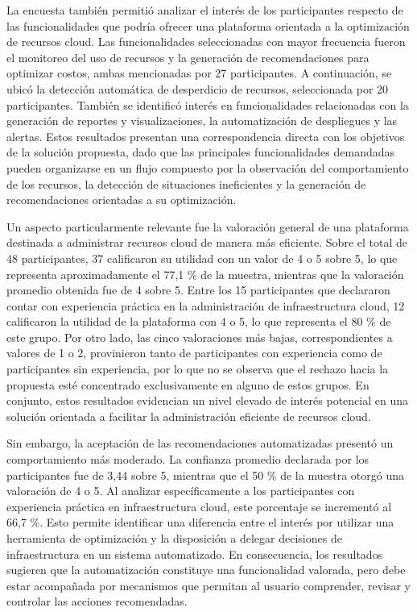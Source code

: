 La encuesta también permitió analizar el interés de los participantes
respecto de las funcionalidades que podría ofrecer una plataforma
orientada a la optimización de recursos cloud. Las funcionalidades
seleccionadas con mayor frecuencia fueron el monitoreo del uso de
recursos y la generación de recomendaciones para optimizar costos, ambas
mencionadas por 27 participantes. A continuación, se ubicó la detección
automática de desperdicio de recursos, seleccionada por 20
participantes. También se identificó interés en funcionalidades
relacionadas con la generación de reportes y visualizaciones, la
automatización de despliegues y las alertas. Estos resultados presentan
una correspondencia directa con los objetivos de la solución propuesta,
dado que las principales funcionalidades demandadas pueden organizarse
en un flujo compuesto por la observación del comportamiento de los
recursos, la detección de situaciones ineficientes y la generación de
recomendaciones orientadas a su optimización.

Un aspecto particularmente relevante fue la valoración general de una
plataforma destinada a administrar recursos cloud de manera más
eficiente. Sobre el total de 48 participantes, 37 calificaron su
utilidad con un valor de 4 o 5 sobre 5, lo que representa
aproximadamente el 77,1 \% de la muestra, mientras que la valoración
promedio obtenida fue de 4 sobre 5. Entre los 15 participantes que
declararon contar con experiencia práctica en la administración de
infraestructura cloud, 12 calificaron la utilidad de la plataforma con 4
o 5, lo que representa el 80 \% de este grupo. Por otro lado, las cinco
valoraciones más bajas, correspondientes a valores de 1 o 2, provinieron
tanto de participantes con experiencia como de participantes sin
experiencia, por lo que no se observa que el rechazo hacia la propuesta
esté concentrado exclusivamente en alguno de estos grupos. En conjunto,
estos resultados evidencian un nivel elevado de interés potencial en una
solución orientada a facilitar la administración eficiente de recursos
cloud.

Sin embargo, la aceptación de las recomendaciones automatizadas presentó
un comportamiento más moderado. La confianza promedio declarada por los
participantes fue de 3,44 sobre 5, mientras que el 50 \% de la muestra
otorgó una valoración de 4 o 5. Al analizar específicamente a los
participantes con experiencia práctica en infraestructura cloud, este
porcentaje se incrementó al 66,7 \%. Esto permite identificar una
diferencia entre el interés por utilizar una herramienta de optimización
y la disposición a delegar decisiones de infraestructura en un sistema
automatizado. En consecuencia, los resultados sugieren que la
automatización constituye una funcionalidad valorada, pero debe estar
acompañada por mecanismos que permitan al usuario comprender, revisar y
controlar las acciones recomendadas.

